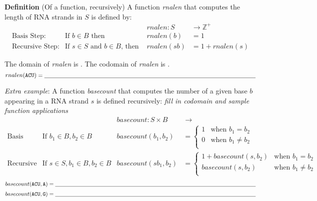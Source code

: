 
{\bf Definition} (Of a function, recursively) A function \textit{rnalen} that computes the length of RNA strands in $S$ is defined by:
\[
\begin{array}{llll}
& & \textit{rnalen} : S & \to \mathbb{Z}^+ \\
\textrm{Basis Step:} & \textrm{If } b \in B\textrm{ then } & \textit{rnalen}(b) & = 1 \\
\textrm{Recursive Step:} & \textrm{If } s \in S\textrm{ and }b \in B\textrm{, then  } & \textit{rnalen}(sb) & = 1 + \textit{rnalen}(s)
\end{array}
\]

The domain of \textit{rnalen} is \underline{}.
The codomain of \textit{rnalen} is \underline{}.
\[
rnalen(\A\C\U) = \underline{\phantom{\hspace{5in}}}
\]

\vfill

{\it Extra example}: A function \textit{basecount} that computes the number of a given base $b$ appearing in a RNA strand $s$ is defined recursively:  {\it fill in codomain and sample function
applications}
\[
\begin{array}{llll}
& & \textit{basecount} : S \times B & \to \phantom{\mathbb{N}} \\
\textrm{Basis Step:} &  \textrm{If } b_1 \in B, b_2 \in B & \textit{basecount}(b_1, b_2) & =
        \begin{cases}
            1 & \textrm{when } b_1 = b_2 \\
            0 & \textrm{when } b_1 \neq b_2 \\
        \end{cases} \\
\textrm{Recursive Step:} & \textrm{If } s \in S, b_1 \in B, b_2 \in B &\textit{basecount}(s b_1, b_2) & =
        \begin{cases}
            1 + \textit{basecount}(s, b_2) & \textrm{when } b_1 = b_2 \\
            \textit{basecount}(s, b_2) & \textrm{when } b_1 \neq b_2 \\
        \end{cases}
\end{array}
\]
\[
basecount(\A\C\U,\A) = \underline{\phantom{\hspace{5in}}}
\]
\[
basecount(\A\C\U,\G) = \underline{\phantom{\hspace{5in}}}
\]
